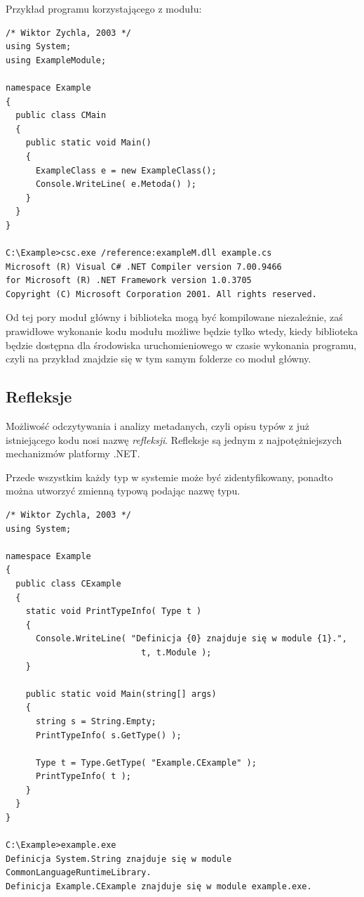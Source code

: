 Przykład programu korzystającego z modułu:

\begin{scriptsize}
\begin{verbatim}
/* Wiktor Zychla, 2003 */
using System;
using ExampleModule;

namespace Example
{ 
  public class CMain
  {    
    public static void Main()
    {
      ExampleClass e = new ExampleClass();
      Console.WriteLine( e.Metoda() );
    }
  }
}

C:\Example>csc.exe /reference:exampleM.dll example.cs
Microsoft (R) Visual C# .NET Compiler version 7.00.9466
for Microsoft (R) .NET Framework version 1.0.3705
Copyright (C) Microsoft Corporation 2001. All rights reserved.
\end{verbatim}
\end{scriptsize}

Od tej pory moduł główny i biblioteka mogą być kompilowane niezależnie, zaś prawidłowe wykonanie kodu
modułu możliwe będzie tylko wtedy, kiedy biblioteka będzie dostępna dla środowiska uruchomieniowego
w czasie wykonania programu, czyli na przykład znajdzie się w tym samym folderze co moduł główny.

\subsection{Refleksje}

Możliwość odczytywania i analizy metadanych, czyli opisu typów z już istniejącego kodu nosi 
nazwę {\em refleksji}. Refleksje są jednym z najpotężniejszych mechanizmów platformy .NET.

Przede wszystkim każdy typ w systemie może być zidentyfikowany, ponadto można utworzyć zmienną 
typową podając nazwę typu.

\begin{scriptsize}
\begin{verbatim}
/* Wiktor Zychla, 2003 */
using System;

namespace Example
{
  public class CExample
  {
    static void PrintTypeInfo( Type t )
    {
      Console.WriteLine( "Definicja {0} znajduje się w module {1}.", 
                           t, t.Module );
    }

    public static void Main(string[] args)
    {
      string s = String.Empty;
      PrintTypeInfo( s.GetType() );

      Type t = Type.GetType( "Example.CExample" );
      PrintTypeInfo( t ); 
    }
  }
}

C:\Example>example.exe
Definicja System.String znajduje się w module CommonLanguageRuntimeLibrary.
Definicja Example.CExample znajduje się w module example.exe.
\end{verbatim}
\end{scriptsize}

